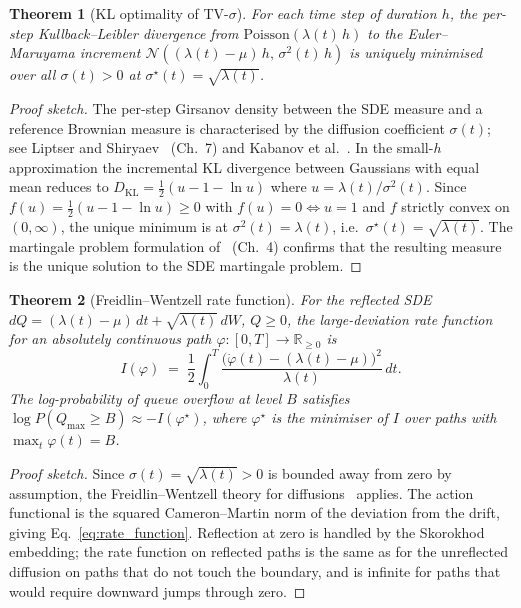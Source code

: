 \documentclass{ieeeaccess}
\newtheorem{theorem}{Theorem}
\begin{document}
\begin{theorem}[KL optimality of TV-$\sigma$]
\label{thm:kl_optimal}
For each time step of duration $h$, the per-step Kullback--Leibler divergence from
$\mathrm{Poisson}(\lambda(t)\,h)$ to the Euler--Maruyama increment
$\mathcal{N}((\lambda(t){-}\mu)\,h,\,\sigma^2(t)\,h)$ is uniquely minimised over all
$\sigma(t) > 0$ at $\sigma^{\star}(t) = \sqrt{\lambda(t)}$.
\end{theorem}
\begin{proof}[Proof sketch]
The per-step Girsanov density between the SDE measure and a reference Brownian measure
is characterised by the diffusion coefficient $\sigma(t)$; see Liptser and
Shiryaev~\cite{liptser2001statistics} (Ch.~7) and Kabanov et al.~\cite{kabanov1978}.
In the small-$h$ approximation the incremental KL divergence between Gaussians with
equal mean reduces to $D_{\mathrm{KL}} = \tfrac{1}{2}(u - 1 - \ln u)$ where
$u = \lambda(t)/\sigma^2(t)$.  Since $f(u) = \tfrac{1}{2}(u-1-\ln u) \ge 0$ with
$f(u)=0 \iff u=1$ and $f$ strictly convex on $(0,\infty)$, the unique minimum is at
$\sigma^2(t) = \lambda(t)$, i.e.\ $\sigma^{\star}(t) = \sqrt{\lambda(t)}$.
The martingale problem formulation of~\cite{ethier1986markov} (Ch.~4) confirms
that the resulting measure is the unique solution to the SDE martingale problem.
\end{proof}

\begin{theorem}[Freidlin--Wentzell rate function]
\label{thm:rate_function}
For the reflected SDE $dQ = (\lambda(t){-}\mu)\,dt + \sqrt{\lambda(t)}\,dW$, $Q \ge 0$,
the large-deviation rate function for an absolutely continuous path
$\varphi : [0,T] \to \mathbb{R}_{\ge 0}$ is
\begin{equation}
    I(\varphi) \;=\; \frac{1}{2}\int_0^T
    \frac{\bigl(\dot\varphi(t) - (\lambda(t)-\mu)\bigr)^2}{\lambda(t)}\,dt .
    \label{eq:rate_function}
\end{equation}
The log-probability of queue overflow at level $B$ satisfies
$\log P(Q_{\max} \ge B) \approx -I(\varphi^{\star})$, where $\varphi^{\star}$ is the
minimiser of $I$ over paths with $\max_t \varphi(t) = B$.
\end{theorem}
\begin{proof}[Proof sketch]
Since $\sigma(t) = \sqrt{\lambda(t)} > 0$ is bounded away from zero by assumption, the
Freidlin--Wentzell theory for diffusions~\cite{dupuis2007dynamic} applies.  The action
functional is the squared Cameron--Martin norm of the deviation from the drift, giving
Eq.~\eqref{eq:rate_function}.  Reflection at zero is handled by the Skorokhod embedding;
the rate function on reflected paths is the same as for the unreflected diffusion on paths
that do not touch the boundary, and is infinite for paths that would require downward jumps
through zero.
\end{proof}
\end{document}
